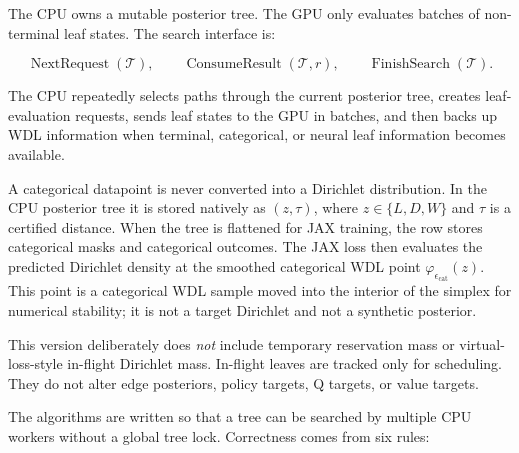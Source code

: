 \documentclass[11pt]{article}
\newcommand{\Tree}{\mathcal{T}}
\newcommand{\NextRequest}{\operatorname{NextRequest}}
\newcommand{\ConsumeResult}{\operatorname{ConsumeResult}}
\newcommand{\FinishSearch}{\operatorname{FinishSearch}}
\newcommand{\CatPoint}{\varphi_{\epsilon_{\mathrm{cat}}}}
\begin{document}
The CPU owns a mutable posterior tree. The GPU only evaluates batches of
non-terminal leaf states. The search interface is:

\[
\NextRequest(\Tree),
\qquad
\ConsumeResult(\Tree,r),
\qquad
\FinishSearch(\Tree).
\]

The CPU repeatedly selects paths through the current posterior tree, creates
leaf-evaluation requests, sends leaf states to the GPU in batches, and then backs
up WDL information when terminal, categorical, or neural leaf information becomes
available.

A categorical datapoint is never converted into a Dirichlet distribution. In the
CPU posterior tree it is stored natively as
\((z,\tau)\), where \(z\in\{L,D,W\}\) and \(\tau\) is a certified distance. When
the tree is flattened for JAX training, the row stores categorical masks and
categorical outcomes. The JAX loss then evaluates the predicted Dirichlet density
at the smoothed categorical WDL point \(\CatPoint(z)\). This point is a
categorical WDL sample moved into the interior of the simplex for numerical
stability; it is not a target Dirichlet and not a synthetic posterior.

This version deliberately does \emph{not} include temporary reservation mass or
virtual-loss-style in-flight Dirichlet mass. In-flight leaves are tracked only
for scheduling. They do not alter edge posteriors, policy targets, Q targets, or
value targets.

The algorithms are written so that a tree can be searched by multiple CPU
workers without a global tree lock. Correctness comes from six rules:
\end{document}
